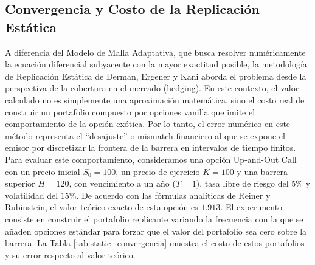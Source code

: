 \subsection{Convergencia y Costo de la Replicación Estática}

A diferencia del Modelo de Malla Adaptativa, que busca resolver numéricamente la ecuación diferencial subyacente con la mayor exactitud posible, la metodología de Replicación Estática de Derman, Ergener y Kani aborda el problema desde la perspectiva de la cobertura en el mercado (hedging). En este contexto, el valor calculado no es simplemente una aproximación matemática, sino el costo real de construir un portafolio compuesto por opciones vanilla que imite el comportamiento de la opción exótica. Por lo tanto, el error numérico en este método representa el ``desajuste'' o mismatch financiero al que se expone el emisor por discretizar la frontera de la barrera en intervalos de tiempo finitos.
Para evaluar este comportamiento, consideramos una opción Up-and-Out Call con un precio inicial $S_0=100$, un precio de ejercicio $K=100$ y una barrera superior $H=120$, con vencimiento a un año ($T=1$), tasa libre de riesgo del $5\%$ y volatilidad del $15\%$. De acuerdo con las fórmulas analíticas de Reiner y Rubinstein, el valor teórico exacto de esta opción es $1.913$.
El experimento consiste en construir el portafolio replicante variando la frecuencia con la que se añaden opciones estándar para forzar que el valor del portafolio sea cero sobre la barrera. La Tabla \ref{tab:static_convergencia} muestra el costo de estos portafolios y su error respecto al valor teórico.

\begin{table}[H]
  \centering
  \caption{Convergencia de la Replicación Estática: efecto del número de opciones de ajuste}
  \label{tab:static_convergencia}
\end{table}

